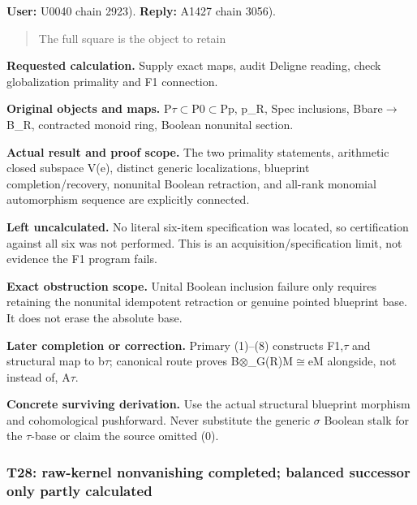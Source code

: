 \documentclass[10pt,a4paper,oneside]{report}
\begin{document}
\textbf{User:} U0040
\protect{} chain 2923).
\textbf{Reply:} A1427
\protect{} chain 3056).

\begin{quote}
The full square is the object to retain
\end{quote}

\textbf{Requested calculation.} Supply exact maps, audit Deligne
reading, check globalization primality and F1 connection.

\textbf{Original objects and maps.}
P\allowbreak{}\ensuremath{τ}\allowbreak{}\allowbreak{}\ensuremath{⊂}\allowbreak{}P0\allowbreak{}\ensuremath{⊂}\allowbreak{}Pp,
p\_R, Spec inclusions,
Bbare\allowbreak{}\ensuremath{→}\allowbreak{}B\_R, contracted monoid
ring, Boolean nonunital section.

\textbf{Actual result and proof scope.} The two primality statements,
arithmetic closed subspace V(e), distinct generic localizations,
blueprint completion/recovery, nonunital Boolean retraction, and
all-rank monomial automorphism sequence are explicitly connected.

\textbf{Left uncalculated.} No literal six-item specification was
located, so certification against all six was not performed. This is an
acquisition/specification limit, not evidence the F1 program fails.

\textbf{Exact obstruction scope.} Unital Boolean inclusion failure only
requires retaining the nonunital idempotent retraction or genuine
pointed blueprint base. It does not erase the absolute base.

\textbf{Later completion or correction.} Primary (1)--(8) constructs
F1,\allowbreak{}\ensuremath{τ}\allowbreak{} and structural map to
b\allowbreak{}\ensuremath{τ}\allowbreak{}; canonical route proves
B\allowbreak{}\ensuremath{⊗}\allowbreak{}\_G(R)M\allowbreak{}\ensuremath{≅}\allowbreak{}eM
alongside, not instead of, A\allowbreak{}\ensuremath{τ}\allowbreak{}.

\textbf{Concrete surviving derivation.} Use the actual structural
blueprint morphism and cohomological pushforward. Never substitute the
generic \allowbreak{}\ensuremath{σ}\allowbreak{} Boolean stalk for the
\allowbreak{}\ensuremath{τ}\allowbreak{}-base or claim the source
omitted (0).

\subsubsection{T28: raw-kernel nonvanishing completed; balanced
successor only partly
calculated}\label{t28-raw-kernel-nonvanishing-completed-balanced-successor-only-partly-calculated}
\end{document}
